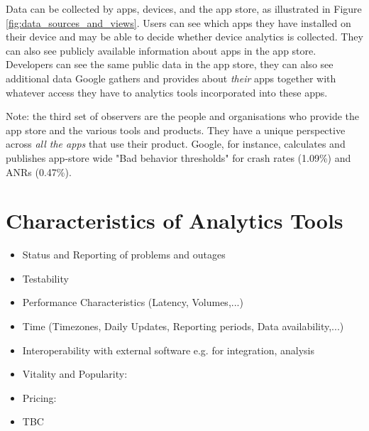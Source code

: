 Data can be collected by apps, devices, and the app store, as illustrated in Figure \ref{fig:data_sources_and_views}. Users can see which apps they have installed on their device and may be able to decide whether device analytics is collected. They can also see publicly available information about apps in the app store. Developers can see the same public data in the app store, they can also see additional data Google gathers and provides about \textit{their} apps together with whatever access they have to analytics tools incorporated into these apps.

Note: the third set of observers are the people and organisations who provide the app store and the various tools and products. They have a unique perspective across \textit{all the apps} that use their product. Google, for instance, calculates and publishes app-store wide "Bad behavior thresholds" for crash rates (1.09\%) and ANRs (0.47\%).

\section{Characteristics of Analytics Tools}


\begin{itemize}
    \item Status and Reporting of problems and outages
    \item Testability
    \item Performance Characteristics (Latency, Volumes,...)
    \item Time (Timezones, Daily Updates, Reporting periods, Data availability,...)
    \item Interoperability with external software e.g. for integration, analysis
    \item Vitality and Popularity: 
    \item Pricing:
    \item TBC
\end{itemize}
